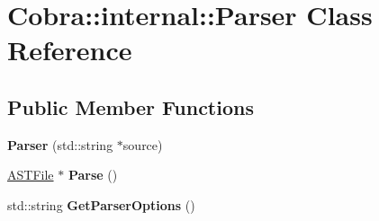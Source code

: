 \hypertarget{class_cobra_1_1internal_1_1_parser}{\section{Cobra\+:\+:internal\+:\+:Parser Class Reference}
\label{class_cobra_1_1internal_1_1_parser}
}
\subsection*{Public Member Functions}
\begin{DoxyCompactItemize}
\item 
\hypertarget{class_cobra_1_1internal_1_1_parser_a325a5b7212b831ac4c8f56a02d3503a2}{{\bfseries Parser} (std\+::string $\ast$source)}\label{class_cobra_1_1internal_1_1_parser_a325a5b7212b831ac4c8f56a02d3503a2}

\item 
\hypertarget{class_cobra_1_1internal_1_1_parser_a8051b75a9ac8860f4bed94e15a59058b}{\hyperlink{class_cobra_1_1internal_1_1_a_s_t_file}{A\+S\+T\+File} $\ast$ {\bfseries Parse} ()}\label{class_cobra_1_1internal_1_1_parser_a8051b75a9ac8860f4bed94e15a59058b}

\item 
\hypertarget{class_cobra_1_1internal_1_1_parser_a6696931061cae449c1fc8980b26ef75a}{std\+::string {\bfseries Get\+Parser\+Options} ()}\label{class_cobra_1_1internal_1_1_parser_a6696931061cae449c1fc8980b26ef75a}

\end{DoxyCompactItemize}
